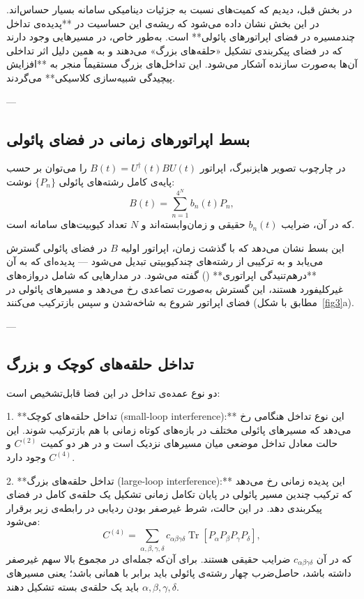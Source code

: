 در بخش قبل، دیدیم که کمیت‌های  نسبت به جزئیات دینامیکی سامانه بسیار حساس‌اند. در این بخش نشان داده می‌شود که ریشه‌ی این حساسیت در **پدیده‌ی تداخل چندمسیره در فضای اپراتورهای پائولی** است.  
به‌طور خاص، در  مسیرهایی وجود دارند که در فضای پیکربندی تشکیل «حلقه‌های بزرگ» می‌دهند و به همین دلیل اثر تداخلی آن‌ها به‌صورت سازنده آشکار می‌شود. این تداخل‌های بزرگ مستقیماً منجر به **افزایش پیچیدگی شبیه‌سازی کلاسیکی** می‌گردند.

---

\subsection{بسط اپراتورهای زمانی در فضای پائولی}

در چارچوب تصویر هایزنبرگ، اپراتور \( B(t) = U^\dagger(t) B U(t) \) را می‌توان بر حسب پایه‌ی کامل رشته‌های پائولی \(\{P_n\}\) نوشت:
\[
B(t) = \sum_{n=1}^{4^N} b_n(t) P_n,
\]
که در آن، ضرایب \(b_n(t)\) حقیقی و زمان‌وابسته‌اند و \(N\) تعداد کیوبیت‌های سامانه است.

این بسط نشان می‌دهد که با گذشت زمان، اپراتور اولیه \(B\) در فضای پائولی گسترش می‌یابد و به ترکیبی از رشته‌های چندکیوبیتی تبدیل می‌شود — پدیده‌ای که به آن **درهم‌تنیدگی اپراتوری** () گفته می‌شود.  
در مدارهایی که شامل دروازه‌های غیرکلیفورد هستند، این گسترش به‌صورت تصاعدی رخ می‌دهد و مسیرهای پائولی در فضای اپراتور شروع به شاخه‌شدن و سپس بازترکیب می‌کنند (مطابق با شکل~\ref{fig3}a).

---

\subsection{تداخل حلقه‌های کوچک و بزرگ}

دو نوع عمده‌ی تداخل در این فضا قابل‌تشخیص است:

1. **تداخل حلقه‌های کوچک (small-loop interference):**  
این نوع تداخل هنگامی رخ می‌دهد که مسیرهای پائولی مختلف در بازه‌های کوتاه زمانی با هم بازترکیب شوند. این حالت معادل تداخل موضعی میان مسیرهای نزدیک است و در هر دو کمیت \(C^{(2)}\) و \(C^{(4)}\) وجود دارد.

2. **تداخل حلقه‌های بزرگ (large-loop interference):**  
این پدیده زمانی رخ می‌دهد که ترکیب چندین مسیر پائولی در پایان تکامل زمانی تشکیل یک حلقه‌ی کامل در فضای پیکربندی دهد. در این حالت، شرط غیرصفر بودن ردیابی در رابطه‌ی زیر برقرار می‌شود:
\[
C^{(4)} = \sum_{\alpha, \beta, \gamma, \delta} c_{\alpha\beta\gamma\delta}
\operatorname{Tr}\!\left[P_\alpha P_\beta P_\gamma P_\delta\right],
\tag{2}
\]
که در آن \(c_{\alpha\beta\gamma\delta}\) ضرایب حقیقی هستند.  
برای آن‌که جمله‌ای در مجموع بالا سهم غیرصفر داشته باشد، حاصل‌ضرب چهار رشته‌ی پائولی باید برابر با همانی باشد؛ یعنی مسیرهای \(\alpha, \beta, \gamma, \delta\) باید یک حلقه‌ی بسته تشکیل دهند.

